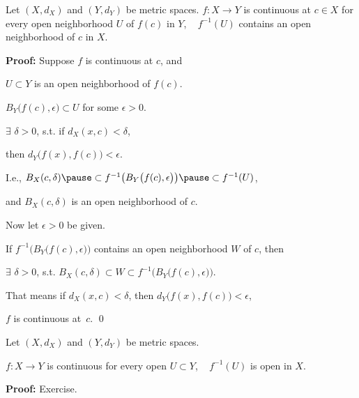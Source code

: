 \documentclass[10pt,aspectratio=149]{beamer}
\begin{document}
\begin{frame}
\begin{lemma}
Let $(X,d_X)$ and $(Y,d_Y)$ be metric spaces.
\pause
$f \colon X \to Y$ is continuous at $c \in X$
\wiffif for every open neighborhood $U$ of $f(c)$ in $Y$,  ~
$f^{-1}(U)$ contains an open neighborhood of $c$ in $X$.
\end{lemma}

\pause
\hfill{}

\vspace*{-1.05in}

\pause
\textbf{Proof:}
Suppose $f$ is continuous at $c$, and

\pause
$U \subset Y$ is an open neighborhood of $f(c)$.

\pause
\thus \quad
$B_Y\bigl(f(c),\epsilon\bigr) \subset U$ for some $\epsilon > 0$.

\pause
$\exists$ $\delta > 0$, s.t. if $d_X(x,c) < \delta$,

\pause
then
$d_Y\bigl(f(x),f(c)\bigr) < \epsilon$.

\pause
I.e.,
$
B_X(c,\delta)
\pause
\subset f^{-1}\bigl(B_Y\bigl(f(c),\epsilon\bigr)\bigr)
\pause
\subset
f^{-1}(U)$,

\pause
and $B_X(c,\delta)$ is an open neighborhood of $c$.

\pause
\medskip

Now let $\epsilon > 0$ be given.

\pause
If $f^{-1}\bigl(B_Y\bigl(f(c),\epsilon\bigr)\bigr)$ contains an open
neighborhood $W$ of $c$, then

\pause
$\exists$ $\delta > 0$, s.t.
$B_X(c,\delta) \subset W \subset
f^{-1}\bigl(B_Y\bigl(f(c),\epsilon\bigr)\bigr)$.

\pause
That means if $d_X(x,c) < \delta$,
then $d_Y\bigl(f(x),f(c)\bigr) < \epsilon$,

\pause
\thus \quad $f$ is continuous at~$c$.
\qed

\end{frame}

\begin{frame}

\begin{theorem}
Let $(X,d_X)$ and $(Y,d_Y)$ be metric spaces.

\pause
$f \colon X \to Y$
is continuous
\wiffif
for every open $U \subset Y$, ~ $f^{-1}(U)$ is open in $X$.
\end{theorem}

\pause
\textbf{Proof:} Exercise.

\end{frame}
\end{document}
